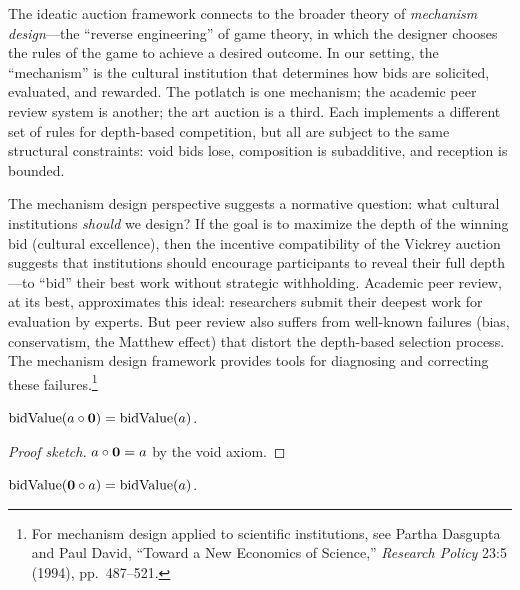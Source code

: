 \begin{remark}
\label{rem:mechanism-design}
The ideatic auction framework connects to the broader theory of
\emph{mechanism design}---the ``reverse engineering'' of game theory, in
which the designer chooses the rules of the game to achieve a desired
outcome.  In our setting, the ``mechanism'' is the cultural institution
that determines how bids are solicited, evaluated, and rewarded.  The
potlatch is one mechanism; the academic peer review system is another;
the art auction is a third.  Each implements a different set of rules
for depth-based competition, but all are subject to the same structural
constraints: void bids lose, composition is subadditive, and reception
is bounded.

The mechanism design perspective suggests a normative question: what
cultural institutions \emph{should} we design?  If the goal is to maximize
the depth of the winning bid (cultural excellence), then the incentive
compatibility of the Vickrey auction suggests that institutions should
encourage participants to reveal their full depth---to ``bid'' their
best work without strategic withholding.  Academic peer review, at its
best, approximates this ideal: researchers submit their deepest work for
evaluation by experts.  But peer review also suffers from well-known
failures (bias, conservatism, the Matthew effect) that distort the
depth-based selection process.  The mechanism design framework provides
tools for diagnosing and correcting these failures.\footnote{For mechanism
design applied to scientific institutions, see Partha Dasgupta and
Paul David, ``Toward a New Economics of Science,'' \textit{Research
Policy} 23:5 (1994), pp.\ 487--521.}
\end{remark}

\begin{theorem}
\label{thm:void-bid-right}
$\operatorname{bidValue}(a \circ \mathbf{0}) = \operatorname{bidValue}(a)$.
\end{theorem}

\begin{proof}[Proof sketch]
$a \circ \mathbf{0} = a$ by the void axiom.
\end{proof}

\begin{theorem}
\label{thm:void-bid-left}
$\operatorname{bidValue}(\mathbf{0} \circ a) = \operatorname{bidValue}(a)$.
\end{theorem}

